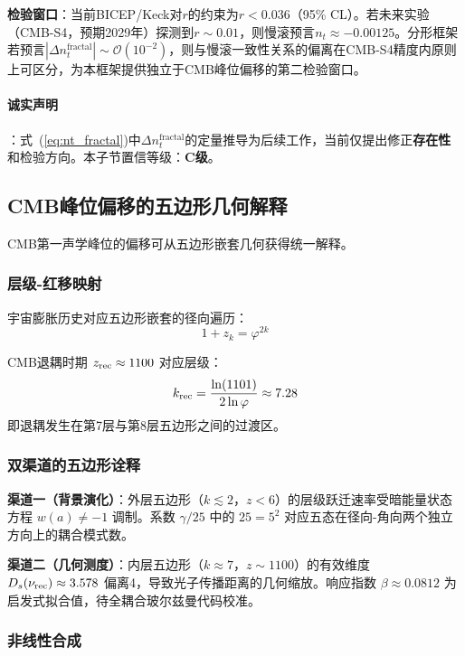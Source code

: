 \documentclass[12pt,a4paper,twocolumn]{article}
\renewcommand{\phi}{\varphi}
\begin{document}
\textbf{检验窗口}：当前BICEP/Keck对$r$的约束为$r < 0.036$（95\% CL）。若未来实验（CMB-S4，预期2029年）探测到$r \sim 0.01$，则慢滚预言$n_t \approx -0.00125$。分形框架若预言$|\Delta n_t^{\text{fractal}}| \sim \mathcal{O}(10^{-2})$，则与慢滚一致性关系的偏离在CMB-S4精度内原则上可区分，为本框架提供独立于CMB峰位偏移的第二检验窗口。

\paragraph{诚实声明}：式~(\ref{eq:nt_fractal})中$\Delta n_t^{\text{fractal}}$的定量推导为后续工作，当前仅提出修正\textbf{存在性}和检验方向。本子节置信等级：\textbf{C级}。

\subsection{CMB峰位偏移的五边形几何解释}
\label{subsec:cmb_pentagon}

CMB第一声学峰位的偏移可从五边形嵌套几何获得统一解释。

\subsubsection{层级-红移映射}

宇宙膨胀历史对应五边形嵌套的径向遍历：
\begin{equation}
1+z_k = \phi^{2k}
\end{equation}

CMB退耦时期 $z_{\rm rec} \approx 1100$ 对应层级：
\begin{equation}
k_{\rm rec} = \frac{\ln(1101)}{2\ln\phi} \approx 7.28
\end{equation}
即退耦发生在第7层与第8层五边形之间的过渡区。

\subsubsection{双渠道的五边形诠释}

\textbf{渠道一（背景演化）}：外层五边形（$k \lesssim 2$，$z < 6$）的层级跃迁速率受暗能量状态方程 $w(a) \neq -1$ 调制。系数 $\gamma/25$ 中的 $25=5^2$ 对应五态在径向-角向两个独立方向上的耦合模式数。

\textbf{渠道二（几何测度）}：内层五边形（$k \approx 7$，$z \sim 1100$）的有效维度 $D_s(\nu_{\rm rec}) \approx 3.578$ 偏离4，导致光子传播距离的几何缩放。响应指数 $\beta \approx 0.0812$ 为启发式拟合值，待全耦合玻尔兹曼代码校准。

\subsubsection{非线性合成}
\end{document}
